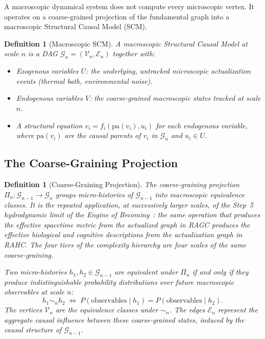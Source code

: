 \documentclass[11pt,a4paper]{article}
\newtheorem{definition}[theorem]{Definition}
\theoremstyle{remark}
\newcommand{\GG}{\mathcal{G}}
\newcommand{\VV}{\mathcal{V}}
\newcommand{\EE}{\mathcal{E}}
\begin{document}
A macroscopic dynamical system does not compute every microscopic vertex. It
operates on a coarse-grained projection of the fundamental graph into a
macroscopic Structural Causal Model (SCM).

\begin{definition}[Macroscopic SCM]
A \emph{macroscopic Structural Causal Model} at scale $n$ is a DAG
$\GG_n = (\VV_n, \EE_n)$ together with:
\begin{itemize}[noitemsep]
  \item \emph{Exogenous variables} $U$: the underlying, untracked microscopic
    actualization events (thermal bath, environmental noise).
  \item \emph{Endogenous variables} $V$: the coarse-grained macroscopic states
    tracked at scale $n$.
  \item A structural equation $v_i = f_i(\mathrm{pa}(v_i), u_i)$ for each
    endogenous variable, where $\mathrm{pa}(v_i)$ are the causal parents of
    $v_i$ in $\GG_n$ and $u_i \in U$.
\end{itemize}
\end{definition}

\subsection{The Coarse-Graining Projection}

\begin{definition}[Coarse-Graining Projection]
The coarse-graining projection $\Pi_n : \GG_{n-1} \to \GG_n$ groups micro-histories
of $\GG_{n-1}$ into macroscopic equivalence classes. It is the repeated application,
at successively larger scales, of the Step~5 hydrodynamic limit of the Engine of
Becoming~\citep{Sandeman2026RAEB}: the same operation that produces the effective
spacetime metric from the actualized graph in RAGC produces the effective
biological and cognitive descriptions from the actualization graph in RAHC. The
four tiers of the complexity hierarchy are four scales of the same coarse-graining.

Two micro-histories $h_1, h_2 \in \GG_{n-1}$ are equivalent under $\Pi_n$ if and
only if they produce indistinguishable probability distributions over future
macroscopic observables at scale $n$:
\begin{equation}
  h_1 \sim_n h_2
  \;\iff\;
  P(\text{observables} \mid h_1) = P(\text{observables} \mid h_2).
  \label{eq:equiv}
\end{equation}
The vertices $\VV_n$ are the equivalence classes under $\sim_n$. The edges
$\EE_n$ represent the aggregate causal influence between these coarse-grained states,
induced by the causal structure of $\GG_{n-1}$.
\end{definition}
\end{document}
